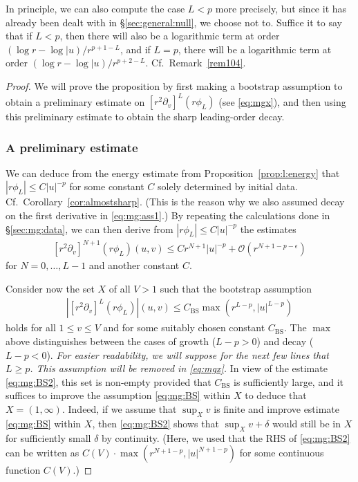 \documentclass[11pt,english]{article}
\numberwithin{equation}{section}
\theoremstyle{remark}
\theoremstyle{plain}
\theoremstyle{remark}
\newcommand{\pv}{\partial_v}
\renewcommand{\(}{\left(}
\renewcommand{\)}{\right)}
\begin{document}
In principle, we can also compute the case $L<p$ more precisely, but since it has already been dealt with in \S \ref{sec:general:null}, we choose not to.
 Suffice it to say that if $L<p$, then there will also be a logarithmic term at order $(\log r-\log|u)/r^{p+1-L}$, and if $L=p$, there will be a logarithmic term at order $(\log r-\log|u)/r^{p+2-L}$. Cf.~Remark~\ref{rem104}.
\begin{proof}
We will prove the proposition by first making a bootstrap assumption to obtain a preliminary estimate on $[r^2\pv]^L(r\phi_L)$ (see \eqref{eq:mgx}), and then using this preliminary estimate to obtain the sharp leading-order decay.
\subsubsection{A preliminary estimate}
We can deduce from the energy estimate from Proposition~\ref{prop:l:energy} that $|r\phi_L|\leq C |u|^{-p}$ for some constant $C$ solely determined by initial data. 
Cf.\ Corollary~\ref{cor:almostsharp}. 
(This is the reason why we also assumed decay on the first derivative in \eqref{eq:mg:ass1}.)
By repeating the calculations done in \S \ref{sec:mg:data}, we can then derive from $|r\phi_L|\leq C |u|^{-p}$ the estimates
\begin{align}\label{eq:mg:BS2}
[r^2\pv]^{N+1}(r\phi_L)(u,v)\leq C r^{N+1}|u|^{-p}+\mathcal{O}(r^{N+1-p-\epsilon})
\end{align}
 for $N=0,\dots, L-1$ and another constant $C$.

Consider now the set $X$ of all $V> 1$ such that the bootstrap assumption
\begin{align}\label{eq:mg:BS}
\left|[r^2\pv]^L(r\phi_L)\right|(u,v)\leq C_{\mathrm{BS}} \max(r^{L-p},|u|^{L-p})
\end{align}
holds for all $1\leq v\leq V$ and
for some suitably chosen constant $C_{\mathrm{BS}}$. 
The $\max$ above distinguishes between the cases of growth ($L-p>0$) and decay ($L-p<0$). 
\textit{For easier readability, we will suppose for the next few lines that $L\geq p$. This assumption will be removed in \eqref{eq:mgx}.}
 In view of the estimate \eqref{eq:mg:BS2}, this set is non-empty provided that $C_{\mathrm{BS}}$ is sufficiently large, and it suffices to improve the assumption \eqref{eq:mg:BS} within $X$ to deduce that $X=(1,\infty)$. 
 Indeed, if we assume that $\sup_X v$ is finite and improve estimate \eqref{eq:mg:BS} within $X$, then \eqref{eq:mg:BS2} shows that $\sup_X v+\delta$ would still be in $X$ for sufficiently small $\delta$ by continuity.
 (Here, we used that the RHS of \eqref{eq:mg:BS2} can be written as $C(V)\cdot \max(r^{N+1-p},|u|^{N+1-p})$ for some continuous function $C(V)$.)


\end{proof}
\end{document}
